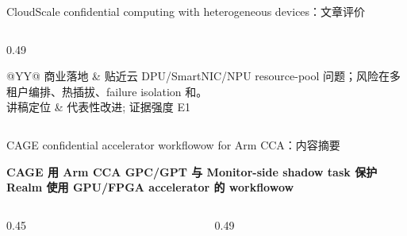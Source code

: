 \begin{frame}[t,shrink=6]{CloudScale confidential computing with heterogeneous devices：文章评价}
\begin{columns}[T,totalwidth=\textwidth]
\begin{column}{0.49\textwidth}
{\begin{minipage}[t]{0.97\linewidth}
\begin{minipage}{0.92\linewidth}
{\begin{tabularx}{\linewidth}{@{}YY@{}}
商业落地 & 贴近云 DPU/SmartNIC/NPU resource-pool 问题；风险在多租户编排、热插拔、failure isolation 和。 \\
讲稿定位 & 代表性改进; 证据强度 E1 \\
\bottomrule
\end{tabularx}
}
    \end{minipage}
    \vspace{1mm}
  \end{minipage}}
  \end{column}
\end{columns}
\end{frame}


\begin{frame}[t,shrink=6]{CAGE confidential accelerator workflowow for Arm CCA：内容摘要}
{\large\bfseries\color{Ink} CAGE 用 Arm CCA GPC/GPT 与 Monitor-side shadow task 保护 Realm 使用 GPU/FPGA accelerator 的 workflowow\par}\vspace{1.2mm}
\begin{columns}[T,totalwidth=\textwidth]
  \begin{column}{0.45\textwidth}
  \end{column}
  \begin{column}{0.49\textwidth}
\end{column}
\end{columns}
\end{frame}
